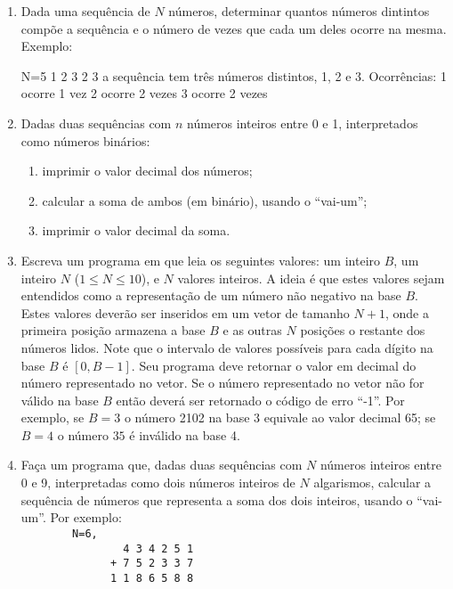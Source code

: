 \begin{enumerate}
\item Dada uma sequência de $N$ números, determinar quantos números dintintos
compõe  a sequência e  o número  de vezes  que cada  um deles  ocorre na
mesma. Exemplo:

N=5
1 2 3 2 3 
a sequência tem três números distintos, 1, 2 e 3. Ocorrências:
1 ocorre 1 vez
2 ocorre 2 vezes
3 ocorre 2 vezes

\item Dadas  duas  sequências  com  $n$  números  inteiros  entre  0  e  1,
interpretados como números binários:
\begin{enumerate}
     \item imprimir o valor decimal dos números;
     \item calcular a soma de ambos (em binário), usando o ``vai-um'';
     \item imprimir o valor decimal da soma.
\end{enumerate}


\item Escreva um programa em  que leia os seguintes valores:
um inteiro $B$, um inteiro $N$ ($1 \leq N \leq 10$), e $N$ valores inteiros.
A ideia é que estes valores sejam entendidos como a representação
de um número não negativo na base $B$. 
Estes valores deverão ser inseridos em um vetor de tamanho $N+1$, onde
a primeira posição armazena a base $B$ e as outras $N$ posições
o restante dos números lidos. 
%
Note que o  intervalo de valores possíveis para cada dígito na
base $B$ é $[0, B-1]$.
%
Seu programa deve retornar o valor em decimal do número representado
no vetor. Se o número representado no vetor não for válido na
base $B$ então deverá ser retornado o código de erro ``-1''.
Por exemplo, se $B=3$ o número 2102 na base 3 equivale ao valor decimal 65;
se $B=4$ o número $35$ é inválido na base 4.


\item Faça um programa que, 
dadas duas sequências com
$N$ números inteiros entre 0 e 9, interpretadas como dois números
inteiros de $N$ algarismos, calcular a sequência de números que
representa a soma dos dois inteiros, usando o ``vai-um''. Por exemplo:\\

\verb|        N=6,|\\
\verb|                4 3 4 2 5 1|\\
\verb|              + 7 5 2 3 3 7|\\
\verb|              1 1 8 6 5 8 8|




\end{enumerate}
